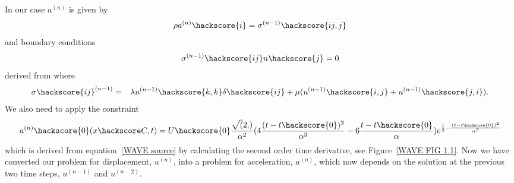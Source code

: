 In our case $a^{(n)}$ is given by
\begin{eqnarray}\label{WAVE dyn 3}
\rho a^{(n)}\hackscore{i}=\sigma^{(n-1)}\hackscore{ij,j}
\end{eqnarray}
and boundary conditions
\begin{eqnarray} \label{WAVE natural at n}
\sigma^{(n-1)}\hackscore{ij}n\hackscore{j}=0
\end{eqnarray}
derived from  where 
\begin{eqnarray} \label{WAVE dyn 3a}
\sigma\hackscore{ij}^{(n-1)} & = & \lambda u^{(n-1)}\hackscore{k,k} \delta\hackscore{ij} + \mu ( u^{(n-1)}\hackscore{i,j} + u^{(n-1)}\hackscore{j,i}).
\end{eqnarray}
We also need to apply the constraint 
\begin{eqnarray} \label{WAVE dyn 3aa}
a^{(n)}\hackscore{0}(x\hackscore C,t)= U\hackscore{0} 
\frac{\sqrt(2.)}{\alpha^2} (4\frac{(t-t\hackscore{0})^3}{\alpha^3}-6\frac{t-t\hackscore{0}}{\alpha})e^{\frac{1}{2}-\frac{(t-t\hackscore{0})^2}{\alpha^2}}
\end{eqnarray}
which is derived from equation~\ref{WAVE source} by calculating the second order time derivative,
see Figure~\ref{WAVE FIG 1.1}. Now we have converted our problem for displacement, $u^{(n)}$, into a problem for 
acceleration, $a^{(n)}$, which now depends 
on the solution at the previous two time steps, $u^{(n-1)}$  and $u^{(n-2)}$.

